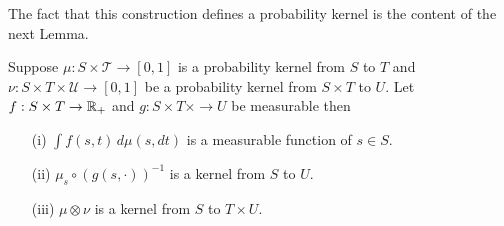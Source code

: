 The fact that this construction defines a probability kernel is the
content of the next Lemma.
\begin{lem}\label{KernelTensorProductMeasurability}Suppose $\mu : S \times \mathcal{T} \to [0,1]$ is a
  probability kernel from $S$ to $T$ and $\nu : S \times T \times
  \mathcal{U} \to [0,1]$ be a probability kernel from $S \times T$ to
  $U$.  Let $f : S \times T \to \mathbb{R}_+$ and $g
  : S \times T \times \to U$  be measurable then 
\begin{itemize}
\item[(i)] $\int f (s, t) \, d\mu(s,dt)$ is a measurable function of $s \in S$.
\item[(ii)] $\mu_s \circ (g(s, \cdot))^{-1}$ is a kernel from $S$ to $U$.
\item[(iii)] $\mu \otimes \nu$ is a kernel from $S$ to $T \times U$.
\end{itemize}
\end{lem}
